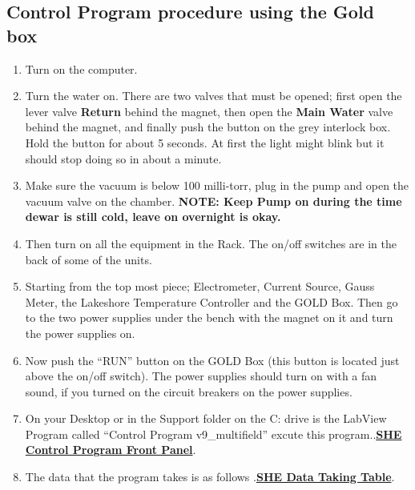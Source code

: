 \documentclass{../lab}
\begin{document}
\subsection{Control Program procedure using the Gold box}

\begin{enumerate}
    \item Turn on the computer.

    \item Turn the water on. There are two valves that must be opened; first open the lever valve \textbf{Return} behind the magnet, then open the \textbf{Main Water} valve behind the magnet, and finally push the button on the grey interlock box. Hold the button for about 5 seconds. At first the light might blink but it should stop doing so in about a minute.

    \item Make sure the vacuum is below 100 milli-torr, plug in the pump and open the vacuum valve on the chamber. \textbf{NOTE: Keep Pump on during the time dewar is still cold, leave on overnight is okay.}

    \item Then turn on all the equipment in the Rack. The on/off switches are in the back of some of the units.

    \item Starting from the top most piece; Electrometer, Current Source, Gauss Meter, the Lakeshore Temperature Controller and the GOLD Box. Then go to the two power supplies under the bench with the magnet on it and turn the power supplies on.

    \item Now push the ``RUN'' button on the GOLD Box (this button is located just above the on/off switch). The power supplies should turn on with a fan sound, if you turned on the circuit breakers on the power supplies.

    \item On your Desktop or in the Support folder on the C: drive is the LabView Program called ``Control Program v9\_multifield'' excute this program..\href{http://experimentationlab.berkeley.edu/sites/default/files/images/SHE\_FrontPanel.pdf}{\textbf{SHE Control Program Front Panel}}.

    \item The data that the program takes is as follows .\href{http://experimentationlab.berkeley.edu/sites/default/files/images/SHE\_Data\_Taking\_Table.pdf}{\textbf{SHE Data Taking Table}}.


\end{enumerate}
\end{document}
